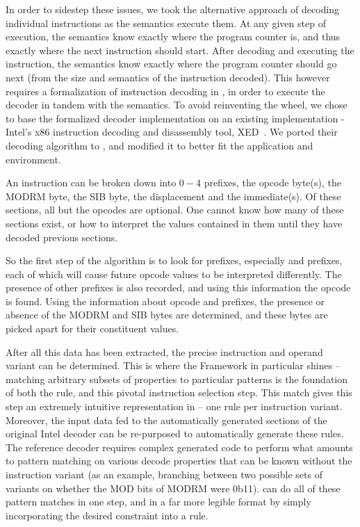 In order to sidestep these issues, we took the alternative approach of decoding individual instructions as the semantics execute them.  At any given step of execution, the semantics know exactly where the program counter is, and thus exactly where the next instruction should start.  After decoding and executing the instruction, the semantics know exactly where the program counter should go next (from the size and semantics of the instruction decoded).  This however requires a formalization of instruction decoding in \K, in order to execute the decoder in tandem with the semantics.  To avoid reinventing the wheel, we chose to base the formalized decoder implementation on an existing implementation - Intel’s x86 instruction decoding and disassembly tool, XED~\cite{xed}.  We ported their decoding algorithm to \K, and modified it to better fit the application and environment. 

An \GENISA instruction can be broken down into $0-4$ prefixes, the opcode byte(s), the MODRM byte, the SIB byte, the displacement and the immediate(s).  Of these sections, all but the opcodes are optional.  One cannot know how many of these sections exist, or how to interpret the values contained in them until they have decoded previous sections. 

So the first step of the algorithm is to look for prefixes, especially  and  prefixes, each of which will cause future opcode values to be interpreted differently.  The presence of other prefixes is also recorded, and using this information the opcode is found.  Using the information about opcode and prefixes, the presence or absence of the MODRM and SIB bytes are determined, and these bytes are picked apart for their constituent values.  

After all this data has been extracted, the precise instruction and operand variant can be determined.  This is where the \K Framework in particular shines – matching arbitrary subsets of properties to particular patterns is the foundation of both the \K rule, and this pivotal instruction selection step.  This match gives this step an extremely intuitive representation in \K – one rule per instruction variant.  Moreover, the input data fed to the automatically generated sections of the original Intel decoder can be re-purposed to automatically generate these \K rules.  The reference decoder requires complex generated code to perform what amounts to pattern matching on various decode properties that can be known without the instruction variant (as an example, branching between two possible sets of variants on whether the MOD bits of MODRM were 0b11).  \K can do all of these pattern matches in one step, and in a far more legible format by simply incorporating the desired constraint into a rule. 

